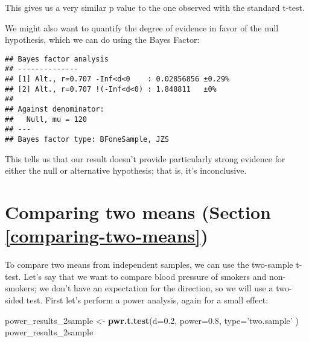 \documentclass[12pt,]{book}
\newenvironment{Shaded}{\begin{snugshade}}{\end{snugshade}}
\newcommand{\DataTypeTok}[1]{\textcolor[rgb]{0.13,0.29,0.53}{#1}}
\newcommand{\DecValTok}[1]{\textcolor[rgb]{0.00,0.00,0.81}{#1}}
\newcommand{\FloatTok}[1]{\textcolor[rgb]{0.00,0.00,0.81}{#1}}
\newcommand{\KeywordTok}[1]{\textcolor[rgb]{0.13,0.29,0.53}{\textbf{#1}}}
\newcommand{\NormalTok}[1]{#1}
\newcommand{\OperatorTok}[1]{\textcolor[rgb]{0.81,0.36,0.00}{\textbf{#1}}}
\newcommand{\OtherTok}[1]{\textcolor[rgb]{0.56,0.35,0.01}{#1}}
\newcommand{\StringTok}[1]{\textcolor[rgb]{0.31,0.60,0.02}{#1}}
\begin{document}
This gives us a very similar p value to the one observed with the standard t-test.

We might also want to quantify the degree of evidence in favor of the null hypothesis, which we can do using the Bayes Factor:

\begin{Shaded}
\end{Shaded}

\begin{verbatim}
## Bayes factor analysis
## --------------
## [1] Alt., r=0.707 -Inf<d<0    : 0.02856856 ±0.29%
## [2] Alt., r=0.707 !(-Inf<d<0) : 1.848811   ±0%
## 
## Against denominator:
##   Null, mu = 120 
## ---
## Bayes factor type: BFoneSample, JZS
\end{verbatim}

This tells us that our result doesn't provide particularly strong evidence for either the null or alternative hypothesis; that is, it's inconclusive.

\hypertarget{comparing-two-means-section-refcomparing-two-means}{%
\section{Comparing two means (Section \ref{comparing-two-means})}\label{comparing-two-means-section-refcomparing-two-means}}

To compare two means from independent samples, we can use the two-sample t-test. Let's say that we want to compare blood pressure of smokers and non-smokers; we don't have an expectation for the direction, so we will use a two-sided test. First let's perform a power analysis, again for a small effect:

\begin{Shaded}
\begin{Highlighting}[]
\NormalTok{power_results_2sample <-}\StringTok{ }\KeywordTok{pwr.t.test}\NormalTok{(}\DataTypeTok{d=}\FloatTok{0.2}\NormalTok{, }\DataTypeTok{power=}\FloatTok{0.8}\NormalTok{,}
                                    \DataTypeTok{type=}\StringTok{'two.sample'}
\NormalTok{                                    )}
\NormalTok{power_results_2sample}
\end{Highlighting}
\end{Shaded}
\end{document}
